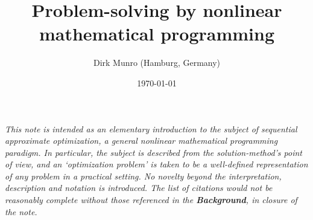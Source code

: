 \documentclass[11pt]{article}
\title{Problem-solving by nonlinear mathematical programming}
\author{Dirk Munro (Hamburg, Germany)}
\date{\today }
\begin{document}
\maketitle





\emph{This note is intended as an elementary introduction to the subject of {sequential approximate optimization}, a general nonlinear mathematical programming paradigm. In particular, the subject is described from the solution-method's point of view, and an `optimization problem' is taken to be a well-defined representation of any \emph{problem} %
in a practical setting. 
No novelty beyond the interpretation, description and notation is introduced. The list of citations would not be reasonably complete without those referenced in the \textbf{Background}, in closure of the note.}
\end{document}
